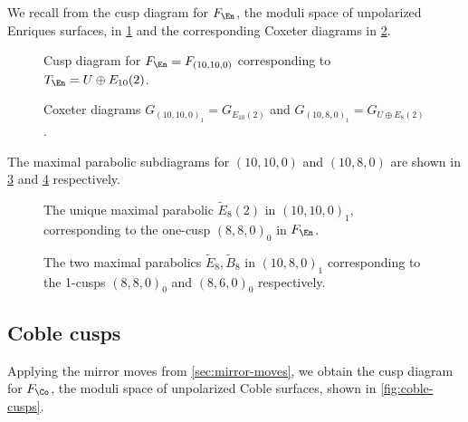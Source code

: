 \documentclass[../../main.tex]{subfiles}
\begin{document}
We recall from \cite{AEGS23} the cusp diagram for $F_\En$, the moduli space of unpolarized Enriques surfaces, in \cref{fig:enriques-cusps} and the corresponding Coxeter diagrams in \cref{fig:enriques-coxeter-diagrams}.

\begin{figure}[H]
    \centering
    
    \caption{Cusp diagram for $F_\En = F_{(10, 10, 0)}$ corresponding to $T_\En = U \oplus E_{10}(2)$.}
    \label{fig:enriques-cusps}
\end{figure}

\begin{figure}[H]
  \centering
  
  \caption{Coxeter diagrams $G_{(10,10,0)_1} = G_{E_{10}(2)}$ and $G_{(10,8,0)_1} = G_{U \oplus E_8(2)}$.}
  \label{fig:enriques-coxeter-diagrams}
\end{figure}

The maximal parabolic subdiagrams for $(10, 10, 0)$ and $(10, 8, 0)$ are shown in \cref{fig:enriques-maximal-parabolics-10-10-0} and \cref{fig:enriques-maximal-parabolics-10-8-0} respectively.

\begin{figure}[H]
    \centering

    \caption{The unique maximal parabolic $\tilde E_8(2)$ in $(10, 10, 0)_1$, corresponding to the one-cusp $(8, 8, 0)_0$ in $F_\En$.}
    \label{fig:enriques-maximal-parabolics-10-10-0}
\end{figure}



\begin{figure}[H]
    \centering
    
    \caption{The two maximal parabolics $\tilde E_8, \tilde B_8$ in $(10, 8, 0)_1$ corresponding to the 1-cusps $(8,8,0)_0$ and $(8,6,0)_0$ respectively.}
    \label{fig:enriques-maximal-parabolics-10-8-0}
\end{figure}

\subsection{Coble cusps}

Applying the mirror moves from \cref{sec:mirror-moves}, we obtain the cusp diagram for $F_\Co$, the moduli space of unpolarized Coble surfaces, shown in \cref{fig:coble-cusps}.
\end{document}
